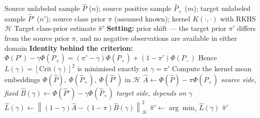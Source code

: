 \documentclass{article}
\begin{document}
\begin{algorithm}[!h]
\renewcommand{\algorithmicrequire}{\textbf{Input:}} %
\renewcommand{\algorithmicensure}{\textbf{Output:}} %
	\caption{TCPU (target class-prior estimation for PU data under label shift)} %
	\begin{algorithmic}[1] %
	    \REQUIRE
	    Source unlabeled sample $\hat{P}$ ($n$); source positive sample $\hat{P}_{+}$ ($m$);
	    target unlabeled sample $\hat{P}'$ ($n'$); source class prior $\pi$ (assumed known);
	    kernel $K(\cdot,\cdot)$ with RKHS $\mathcal{H}$
	    \ENSURE
	    Target class-prior estimate $\hat{\pi}'$
	    \STATE \textbf{Setting:} prior shift --- the target prior $\pi'$ differs from the source
	    prior $\pi$, and no negative observations are available in either domain %
	    \STATE \textbf{Identity behind the criterion:}
	    $\Phi(P')-\gamma\Phi(P_{+})=(\pi'-\gamma)\Phi(P_{+})+(1-\pi')\Phi(P_{-})$ %
	    \STATE \quad Hence $L(\gamma)=[\mathrm{Crit}(\gamma)]^{2}$ is minimised exactly at $\gamma=\pi'$
	    \STATE Compute the kernel mean embeddings
	    $\Phi(\hat{P}),\ \Phi(\hat{P}_{+}),\ \Phi(\hat{P}')$ in $\mathcal{H}$ %
	    \STATE $\hat{A}\leftarrow \Phi(\hat{P})-\pi\Phi(\hat{P}_{+})$
	    \hfill \emph{source side, fixed} %
	    \STATE $\hat{B}(\gamma)\leftarrow \Phi(\hat{P}')-\gamma\Phi(\hat{P}_{+})$
	    \hfill \emph{target side, depends on $\gamma$}
	    \STATE $\hat{L}(\gamma)\leftarrow \left\|(1-\gamma)\hat{A}-(1-\pi)\hat{B}(\gamma)\right\|_{\mathcal{H}}^{2}$ %
	    \STATE $\hat{\pi}'\leftarrow \arg\min_{\gamma}\hat{L}(\gamma)$ %
		\RETURN $\hat{\pi}'$
	\end{algorithmic}
\end{algorithm}
\end{document}
